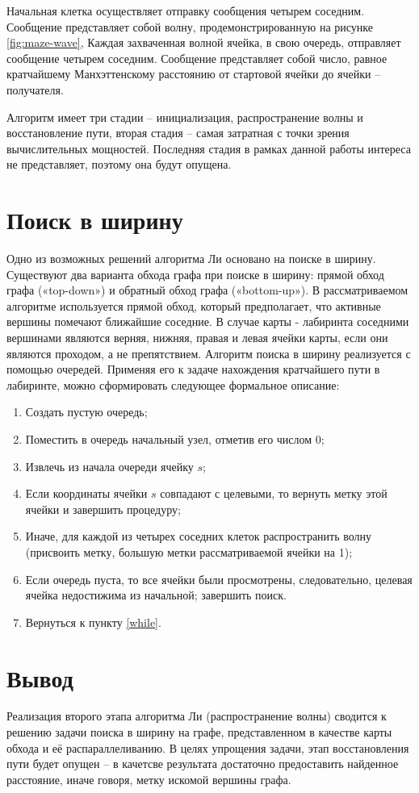 Начальная клетка осуществляет отправку сообщения четырем соседним. Сообщение представляет собой волну, продемонстрированную на рисунке \ref{fig:maze-wave}, Каждая захваченная волной ячейка, в свою очередь, отправляет сообщение четырем соседним. Сообщение представляет собой число, равное кратчайшему Манхэттенскому расстоянию от стартовой ячейки до ячейки -- получателя. 

Алгоритм имеет три стадии -- инициализация, распространение волны и восстановление пути, вторая стадия -- самая затратная с точки зрения вычислительных мощностей. Последняя стадия в рамках данной работы интереса не представляет, поэтому она будут опущена. 

\section{Поиск в ширину}

Одно из возможных решений алгоритма Ли основано на поиске в ширину\cite{bfs}. Существуют два варианта обхода графа при поиске в ширину: прямой обход графа («top-down») и обратный обход графа («bottom-up»). В рассматриваемом алгоритме используется прямой обход, который предполагает, что активные вершины помечают ближайшие соседние. В случае карты - лабиринта соседними вершинами являются верняя, нижняя, правая и левая ячейки карты, если они являются проходом, а не препятствием.
Алгоритм поиска в ширину реализуется с помощью очередей. Применяя его к задаче нахождения кратчайшего пути в лабиринте, можно сформировать следующее формальное описание:
\begin{enumerate}[label=(\roman*)]
	\setlength{\itemsep}{1.2pt}
	\setlength{\parskip}{0pt}
	\setlength{\parsep}{0pt}
	\item Создать пустую очередь;
	\item Поместить в очередь начальный узел, отметив его числом $0$;
	\item Извлечь из начала очереди ячейку $s$;\label{while}
	\item Если координаты ячейки $s$ совпадают с целевыми, то вернуть метку этой ячейки и завершить процедуру;
	\item Иначе, для каждой из четырех соседних клеток распространить волну (присвоить метку, большую метки рассматриваемой ячейки на 1);
	\item Если очередь пуста, то все ячейки были просмотрены, следовательно, целевая ячейка недостижима из начальной; завершить поиск.
	\item Вернуться к пункту \ref{while}.
\end{enumerate}


\section{Вывод}\label{sec:analyth-summ}
Реализация второго этапа алгоритма Ли (распространение волны) сводится к решению задачи поиска в ширину на графе, представленном в качестве карты обхода и её распараллеливанию. В целях упрощения задачи, этап восстановления пути будет опущен -- в качетсве результата достаточно предоставить найденное расстояние, иначе говоря, метку искомой вершины графа.
